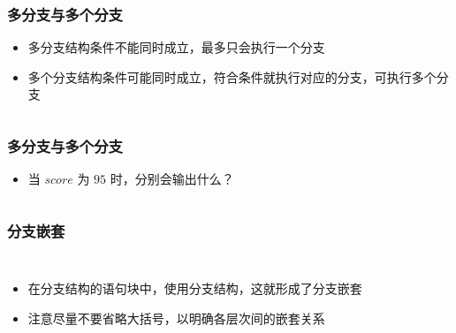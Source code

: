 \begin{frame}[fragile]
    \frametitle{多分支与多个分支}

    \begin{itemize}
        \item<1-> 多分支结构条件不能同时成立，最多只会执行一个分支
        \item<2-> 多个分支结构条件可能同时成立，符合条件就执行对应的分支，可执行多个分支
    \end{itemize}

    \begin{columns}


    \end{columns}
\end{frame}

\begin{frame}[fragile]
    \frametitle{多分支与多个分支}

    \begin{itemize}
        \item 当 $score$ 为 $95$ 时，分别会输出什么？
    \end{itemize}

    \begin{columns}[T]

        

        
    \end{columns}
\end{frame}

\begin{frame}[fragile]
    \frametitle{分支嵌套}

    \begin{columns}
        \begin{itemize}[<+->]
            \item 在分支结构的语句块中，使用分支结构，这就形成了分支嵌套
            \item 注意尽量不要省略大括号，以明确各层次间的嵌套关系
        \end{itemize}

        
    \end{columns}
\end{frame}

